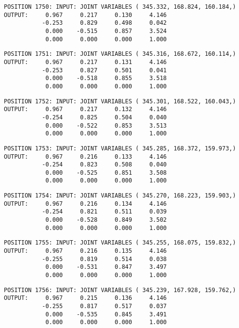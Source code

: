 \begin{verbatim}
POSITION 1750: INPUT: JOINT VARIABLES ( 345.332, 168.824, 160.184,)
OUTPUT:     0.967     0.217     0.130     4.146
           -0.253     0.829     0.498     0.042
            0.000    -0.515     0.857     3.524
            0.000     0.000     0.000     1.000
\end{verbatim} \pagebreak[1]\begin{verbatim}
POSITION 1751: INPUT: JOINT VARIABLES ( 345.316, 168.672, 160.114,)
OUTPUT:     0.967     0.217     0.131     4.146
           -0.253     0.827     0.501     0.041
            0.000    -0.518     0.855     3.518
            0.000     0.000     0.000     1.000
\end{verbatim} \pagebreak[1]\begin{verbatim}
POSITION 1752: INPUT: JOINT VARIABLES ( 345.301, 168.522, 160.043,)
OUTPUT:     0.967     0.217     0.132     4.146
           -0.254     0.825     0.504     0.040
            0.000    -0.522     0.853     3.513
            0.000     0.000     0.000     1.000
\end{verbatim} \pagebreak[1]\begin{verbatim}
POSITION 1753: INPUT: JOINT VARIABLES ( 345.285, 168.372, 159.973,)
OUTPUT:     0.967     0.216     0.133     4.146
           -0.254     0.823     0.508     0.040
            0.000    -0.525     0.851     3.508
            0.000     0.000     0.000     1.000
\end{verbatim} \pagebreak[1]\begin{verbatim}
POSITION 1754: INPUT: JOINT VARIABLES ( 345.270, 168.223, 159.903,)
OUTPUT:     0.967     0.216     0.134     4.146
           -0.254     0.821     0.511     0.039
            0.000    -0.528     0.849     3.502
            0.000     0.000     0.000     1.000
\end{verbatim} \pagebreak[1]\begin{verbatim}
POSITION 1755: INPUT: JOINT VARIABLES ( 345.255, 168.075, 159.832,)
OUTPUT:     0.967     0.216     0.135     4.146
           -0.255     0.819     0.514     0.038
            0.000    -0.531     0.847     3.497
            0.000     0.000     0.000     1.000
\end{verbatim} \pagebreak[1]\begin{verbatim}
POSITION 1756: INPUT: JOINT VARIABLES ( 345.239, 167.928, 159.762,)
OUTPUT:     0.967     0.215     0.136     4.146
           -0.255     0.817     0.517     0.037
            0.000    -0.535     0.845     3.491
            0.000     0.000     0.000     1.000
\end{verbatim} \pagebreak[1]\begin{verbatim}

\end{verbatim}
